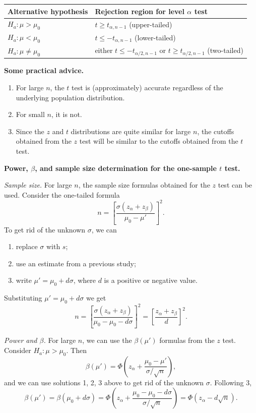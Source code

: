 \begin{center}
\begin{tabular}{ll}
\toprule
Alternative hypothesis & Rejection region for level $\alpha$ test\\
\midrule
$H_a:\mu>\mu_0$   & $t\ge t_{\alpha,n-1}$ (upper-tailed)\\
$H_a:\mu<\mu_0$   & $t\le -t_{\alpha,n-1}$ (lower-tailed)\\
$H_a:\mu\ne\mu_0$ & either $t\le -t_{\alpha/2,n-1}$ or $t\ge t_{\alpha/2,n-1}$ (two-tailed)\\
\bottomrule
\end{tabular}
\end{center}

\textbf{Some practical advice.}
\begin{enumerate}
  \item For large $n$, the $t$ test is (approximately) accurate regardless of the underlying population distribution.
  \item For small $n$, it is not.
  \item Since the $z$ and $t$ distributions are quite similar for large $n$, the cutoffs obtained from the $z$ test will be similar to the cutoffs obtained from the $t$ test.
\end{enumerate}

\textbf{Power, $\beta$, and sample size determination for the one-sample $t$ test.}

\emph{Sample size.} For large $n$, the sample size formulas obtained for the $z$ test can be used.
Consider the one-tailed formula
\[
n = \left[\frac{\sigma(z_\alpha+z_\beta)}{\mu_0-\mu'}\right]^2 .
\]
To get rid of the unknown $\sigma$, we can
\begin{enumerate}
  \item replace $\sigma$ with $s$;
  \item use an estimate from a previous study;
  \item write $\mu'=\mu_0+d\sigma$, where $d$ is a positive or negative value.
\end{enumerate}
Substituting $\mu'=\mu_0+d\sigma$ we get
\[
n = \left[\frac{\sigma(z_\alpha+z_\beta)}{\mu_0-\mu_0-d\sigma}\right]^2 = \left[\frac{z_\alpha+z_\beta}{d}\right]^2 .
\]

\emph{Power and $\beta$.} For large $n$, we can use the $\beta(\mu')$ formulas from the $z$ test.
Consider $H_a:\mu>\mu_0$. Then
\[
\beta(\mu') = \Phi\!\left(z_\alpha + \frac{\mu_0-\mu'}{\sigma/\sqrt{n}}\right),
\]
and we can use solutions 1, 2, 3 above to get rid of the unknown $\sigma$. Following 3,
\[
\beta(\mu') = \beta(\mu_0+d\sigma) = \Phi\!\left(z_\alpha + \frac{\mu_0-\mu_0-d\sigma}{\sigma/\sqrt{n}}\right) = \Phi\!\left(z_\alpha - d\sqrt{n}\right).
\]

